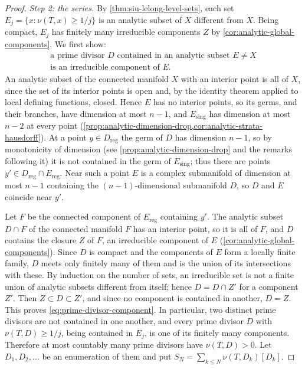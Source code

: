 \begin{proof}
\emph{Step 2: the series.} By \cref{thm:siu-lelong-level-sets}, each set $E_j=\{x:\nu(T,x)\geq1/j\}$ is an analytic subset of $X$ different from $X$. Being compact, $E_j$ has finitely many irreducible components $Z$ by \cref{cor:analytic-global-components}. We first show:
\begin{equation}\label{eq:prime-divisor-component}
 \begin{gathered}
 \text{a prime divisor $D$ contained in an analytic subset $E\neq X$}\\
 \text{is an irreducible component of $E$.}
 \end{gathered}
\end{equation}
An analytic subset of the connected manifold $X$ with an interior point is all of $X$, since the set of its interior points is open and, by the identity theorem applied to local defining functions, closed. Hence $E$ has no interior points, so its germs, and their branches, have dimension at most $n-1$, and $E_{\mathrm{sing}}$ has dimension at most $n-2$ at every point (\cref{prop:analytic-dimension-drop,cor:analytic-strata-hausdorff}). At a point $y\in D_{\mathrm{reg}}$ the germ of $D$ has dimension $n-1$, so by monotonicity of dimension (see \cref{prop:analytic-dimension-drop} and the remarks following it) it is not contained in the germ of $E_{\mathrm{sing}}$; thus there are points $y'\in D_{\mathrm{reg}}\cap E_{\mathrm{reg}}$. Near such a point $E$ is a complex submanifold of dimension at most $n-1$ containing the $(n-1)$-dimensional submanifold $D$, so $D$ and $E$ coincide near $y'$.

Let $F$ be the connected component of $E_{\mathrm{reg}}$ containing $y'$. The analytic subset $D\cap F$ of the connected manifold $F$ has an interior point, so it is all of $F$, and $D$ contains the closure $Z$ of $F$, an irreducible component of $E$ (\cref{cor:analytic-global-components}). Since $D$ is compact and the components of $E$ form a locally finite family, $D$ meets only finitely many of them and is the union of its intersections with these. By induction on the number of sets, an irreducible set is not a finite union of analytic subsets different from itself; hence $D=D\cap Z'$ for a component $Z'$. Then $Z\subset D\subset Z'$, and since no component is contained in another, $D=Z$. This proves \eqref{eq:prime-divisor-component}. In particular, two distinct prime divisors are not contained in one another, and every prime divisor $D$ with $\nu(T,D)\geq1/j$, being contained in $E_j$, is one of its finitely many components. Therefore at most countably many prime divisors have $\nu(T,D)>0$. Let $D_1,D_2,\ldots$ be an enumeration of them and put $S_N=\sum_{k\leq N}\nu(T,D_k)[D_k]$.


\end{proof}
